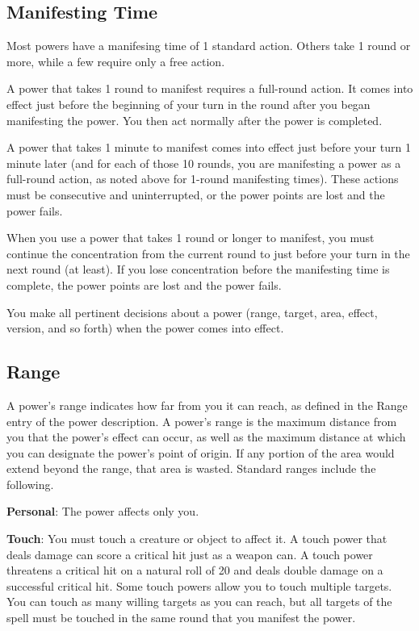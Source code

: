 \subsection{Manifesting Time}
Most powers have a manifesing time of 1 standard action. Others take 1 round or more, while a few require only a free action.

A power that takes 1 round to manifest requires a full-round action. It comes into effect just before the beginning of your turn in the round after you began manifesting the power. You then act normally after the power is completed.

A power that takes 1 minute to manifest comes into effect just before your turn 1 minute later (and for each of those 10 rounds, you are manifesting a power as a full-round action, as noted above for 1-round manifesting times). These actions must be consecutive and uninterrupted, or the power points are lost and the power fails.

When you use a power that takes 1 round or longer to manifest, you must continue the concentration from the current round to just before your turn in the next round (at least). If you lose concentration before the manifesting time is complete, the power points are lost and the power fails.

You make all pertinent decisions about a power (range, target, area, effect, version, and so forth) when the power comes into effect.

\subsection{Range}
A power's range indicates how far from you it can reach, as defined in the Range entry of the power description. A power's range is the maximum distance from you that the power's effect can occur, as well as the maximum distance at which you can designate the power's point of origin. If any portion of the area would extend beyond the range, that area is wasted. Standard ranges include the following.

\textbf{Personal}: The power affects only you.

\textbf{Touch}: You must touch a creature or object to affect it. A touch power that deals damage can score a critical hit just as a weapon can. A touch power threatens a critical hit on a natural roll of 20 and deals double damage on a successful critical hit. Some touch powers allow you to touch multiple targets. You can touch as many willing targets as you can reach, but all targets of the spell must be touched in the same round that you manifest the power.

